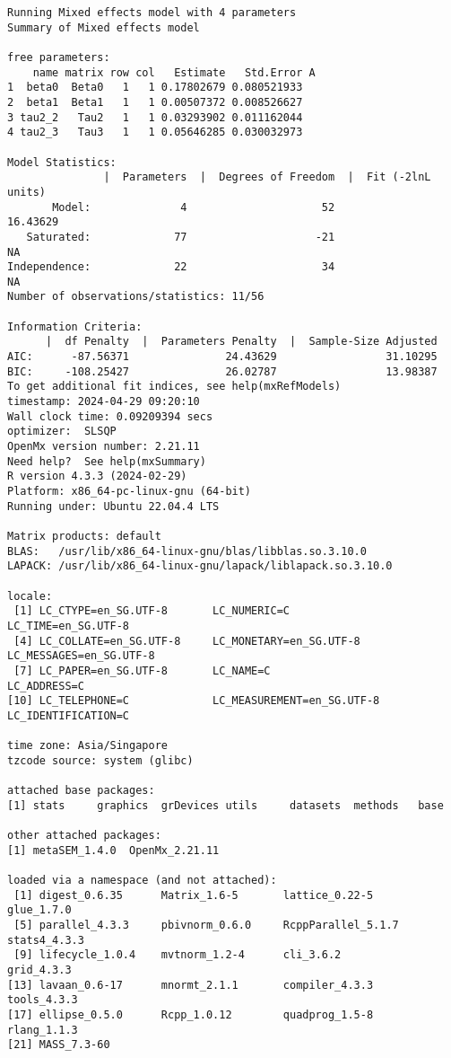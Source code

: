 \documentclass[11pt]{article}
\begin{document}
\begin{verbatim}
Running Mixed effects model with 4 parameters
Summary of Mixed effects model 
 
free parameters:
    name matrix row col   Estimate   Std.Error A
1  beta0  Beta0   1   1 0.17802679 0.080521933  
2  beta1  Beta1   1   1 0.00507372 0.008526627  
3 tau2_2   Tau2   1   1 0.03293902 0.011162044  
4 tau2_3   Tau3   1   1 0.05646285 0.030032973  

Model Statistics: 
               |  Parameters  |  Degrees of Freedom  |  Fit (-2lnL units)
       Model:              4                     52              16.43629
   Saturated:             77                    -21                    NA
Independence:             22                     34                    NA
Number of observations/statistics: 11/56

Information Criteria: 
      |  df Penalty  |  Parameters Penalty  |  Sample-Size Adjusted
AIC:      -87.56371               24.43629                 31.10295
BIC:     -108.25427               26.02787                 13.98387
To get additional fit indices, see help(mxRefModels)
timestamp: 2024-04-29 09:20:10 
Wall clock time: 0.09209394 secs 
optimizer:  SLSQP 
OpenMx version number: 2.21.11 
Need help?  See help(mxSummary)
R version 4.3.3 (2024-02-29)
Platform: x86_64-pc-linux-gnu (64-bit)
Running under: Ubuntu 22.04.4 LTS

Matrix products: default
BLAS:   /usr/lib/x86_64-linux-gnu/blas/libblas.so.3.10.0 
LAPACK: /usr/lib/x86_64-linux-gnu/lapack/liblapack.so.3.10.0

locale:
 [1] LC_CTYPE=en_SG.UTF-8       LC_NUMERIC=C               LC_TIME=en_SG.UTF-8       
 [4] LC_COLLATE=en_SG.UTF-8     LC_MONETARY=en_SG.UTF-8    LC_MESSAGES=en_SG.UTF-8   
 [7] LC_PAPER=en_SG.UTF-8       LC_NAME=C                  LC_ADDRESS=C              
[10] LC_TELEPHONE=C             LC_MEASUREMENT=en_SG.UTF-8 LC_IDENTIFICATION=C       

time zone: Asia/Singapore
tzcode source: system (glibc)

attached base packages:
[1] stats     graphics  grDevices utils     datasets  methods   base     

other attached packages:
[1] metaSEM_1.4.0  OpenMx_2.21.11

loaded via a namespace (and not attached):
 [1] digest_0.6.35      Matrix_1.6-5       lattice_0.22-5     glue_1.7.0        
 [5] parallel_4.3.3     pbivnorm_0.6.0     RcppParallel_5.1.7 stats4_4.3.3      
 [9] lifecycle_1.0.4    mvtnorm_1.2-4      cli_3.6.2          grid_4.3.3        
[13] lavaan_0.6-17      mnormt_2.1.1       compiler_4.3.3     tools_4.3.3       
[17] ellipse_0.5.0      Rcpp_1.0.12        quadprog_1.5-8     rlang_1.1.3       
[21] MASS_7.3-60
\end{verbatim}
\end{document}
